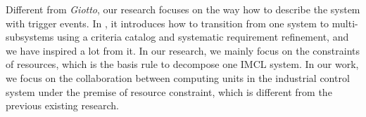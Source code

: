 Different from \emph{Giotto}, our research focuses on the way how to describe the system with trigger events.
In \cite{DBLP:phd/de/Penzenstadler2010}, it introduces how to transition from one system to multi-subsystems using a criteria catalog and systematic requirement refinement, and we have inspired a lot from it. In our research, we mainly focus on the constraints of resources, which is the basis rule to decompose one IMCL system.
In our work, we focus on the collaboration between computing units in the industrial control system under the premise of resource constraint, which is different from the previous existing research.



